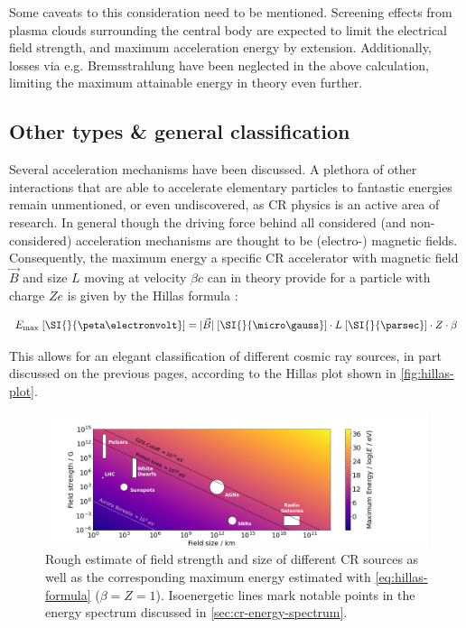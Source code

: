 Some caveats to this consideration need to be mentioned. Screening effects from plasma clouds surrounding the central body are expected to limit the electrical 
field strength, and maximum acceleration energy by extension. Additionally, losses via e.g. Bremsstrahlung have been neglected in the above calculation, limiting
the maximum attainable energy in theory even further. 

\subsection{Other types \& general classification}
\label{ssec:cr-hillas-plot}

Several acceleration mechanisms have been discussed. A plethora of other interactions that are able to accelerate elementary particles to fantastic energies remain
unmentioned, or even undiscovered, as CR physics is an active area of research. In general though the driving force behind all considered (and non-considered)
acceleration mechanisms are thought to be (electro-) magnetic fields. Consequently, the maximum energy a specific CR accelerator with magnetic field $\vec{B}$ and 
size $L$ moving at velocity $\beta c$ can in theory provide for a particle with charge $Ze$ is given by the Hillas formula \cite{hillas1984origin}:

\begin{equation}
\label{eq:hillas-formula}
E_\text{max}\;[\SI{}{\peta\electronvolt}] = |\vec{B}|\;[\SI{}{\micro\gauss}] \cdot L\;[\SI{}{\parsec}] \cdot Z \cdot \beta
\end{equation}

This allows for an elegant classification of different cosmic ray sources, in part discussed on the previous pages, according to the Hillas plot shown in 
\autoref{fig:hillas-plot}.

\begin{figure}
	\centering
	\includegraphics[width=1\textwidth]{./plots/hillas_plot.png}
	\caption{Rough estimate of field strength and size of different CR sources as well as the corresponding maximum energy estimated with 
    \autoref{eq:hillas-formula} ($\beta = Z = 1$). Isoenergetic lines mark notable points in the energy spectrum discussed in 
    \autoref{sec:cr-energy-spectrum}.}
	\label{fig:hillas-plot}
\end{figure}


